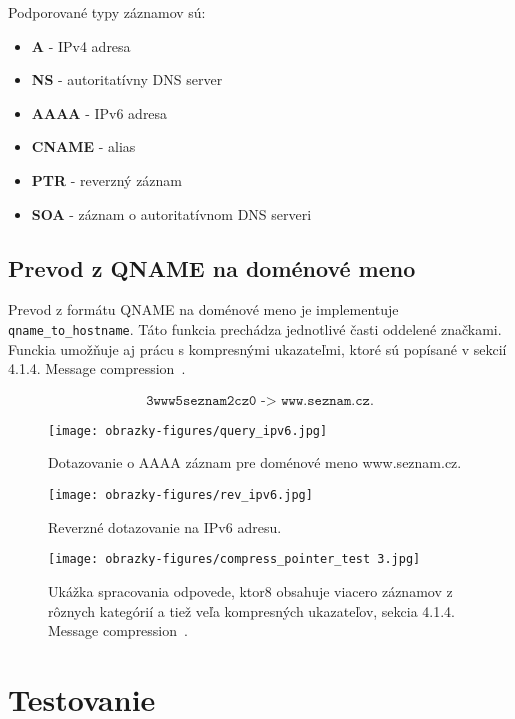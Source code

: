 Podporované typy záznamov sú:
\begin{itemize}
    \item \textbf{A} - IPv4 adresa
    \item \textbf{NS} - autoritatívny DNS server
    \item \textbf{AAAA} - IPv6 adresa
    \item \textbf{CNAME} - alias
    \item \textbf{PTR} - reverzný záznam
    \item \textbf{SOA} - záznam o autoritatívnom DNS serveri
\end{itemize}

\section{Prevod z QNAME na doménové meno}
Prevod z formátu QNAME na doménové meno je implementuje \texttt{qname\_to\_hostname}. Táto funkcia prechádza jednotlivé časti oddelené značkami. Funckia umožňuje aj prácu s kompresnými ukazateľmi, ktoré sú popísané v sekcií 4.1.4. Message compression~\cite{RFC1035}.

\begin{gather*}
    \texttt{3www5seznam2cz0 -> www.seznam.cz.}
\end{gather*}

\begin{figure}[ht]
    \centering     %
    \texttt{[image: obrazky-figures/query\_ipv6.jpg]}
    \caption{Dotazovanie o AAAA záznam pre doménové meno www.seznam.cz.}
    \label{fig:query_ipv6}
\end{figure}
\begin{figure}[ht]
    \centering     %
    \texttt{[image: obrazky-figures/rev\_ipv6.jpg]}
    \caption{Reverzné dotazovanie na IPv6 adresu.}
    \label{fig:rev_ipv6}
\end{figure}
\begin{figure}[ht]
    \centering     %
    \texttt{[image: obrazky-figures/compress\_pointer\_test 3.jpg]}
    \caption{Ukážka spracovania odpovede, ktor8 obsahuje viacero záznamov z rôznych kategórií a tiež veľa kompresných ukazateľov, sekcia 4.1.4. Message compression~\cite{RFC1035}.}
    \label{fig:compress_pointer_test_ipv6}
\end{figure}

\chapter{Testovanie}\label{chap:testovanie}




